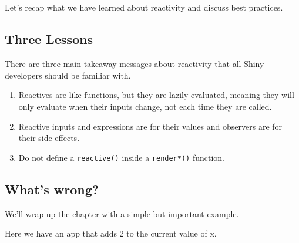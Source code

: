 \documentclass[
  letterpaper,
  DIV=11,
  numbers=noendperiod]{scrreprt}
\providecommand{\tightlist}{%
  \setlength{\itemsep}{0pt}\setlength{\parskip}{0pt}}
\begin{document}
\hypertarget{section-52}{%
\subsection{}\label{section-52}}

Let's recap what we have learned about reactivity and discuss best
practices.

\hypertarget{three-lessons}{%
\subsection{Three Lessons}\label{three-lessons}}

There are three main takeaway messages about reactivity that all Shiny
developers should be familiar with.

\begin{enumerate}
\def\labelenumi{\arabic{enumi}.}
\tightlist
\item
  Reactives are like functions, but they are lazily evaluated, meaning
  they will only evaluate when their inputs change, not each time they
  are called.
\item
  Reactive inputs and expressions are for their values and observers are
  for their side effects.
\item
  Do not define a \texttt{reactive()} inside a \texttt{render*()}
  function.
\end{enumerate}

\hypertarget{whats-wrong}{%
\subsection{What's wrong?}\label{whats-wrong}}

We'll wrap up the chapter with a simple but important example.

Here we have an app that adds 2 to the current value of x.
\end{document}
